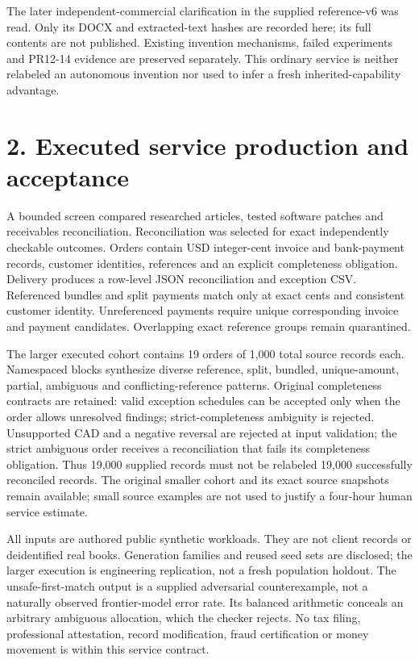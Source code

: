 \documentclass[10pt,letterpaper]{article}
\begin{document}
The later independent-commercial clarification in the supplied reference-v6 was read. Only its DOCX and extracted-text hashes are recorded here; its full contents are not published. Existing invention mechanisms, failed experiments and PR12-14 evidence are preserved separately. This ordinary service is neither relabeled an autonomous invention nor used to infer a fresh inherited-capability advantage.

\section*{2. Executed service production and acceptance}
A bounded screen compared researched articles, tested software patches and receivables reconciliation. Reconciliation was selected for exact independently checkable outcomes. Orders contain USD integer-cent invoice and bank-payment records, customer identities, references and an explicit completeness obligation. Delivery produces a row-level JSON reconciliation and exception CSV. Referenced bundles and split payments match only at exact cents and consistent customer identity. Unreferenced payments require unique corresponding invoice and payment candidates. Overlapping exact reference groups remain quarantined.

The larger executed cohort contains 19 orders of 1,000 total source records each. Namespaced blocks synthesize diverse reference, split, bundled, unique-amount, partial, ambiguous and conflicting-reference patterns. Original completeness contracts are retained: valid exception schedules can be accepted only when the order allows unresolved findings; strict-completeness ambiguity is rejected. Unsupported CAD and a negative reversal are rejected at input validation; the strict ambiguous order receives a reconciliation that fails its completeness obligation. Thus 19,000 supplied records must not be relabeled 19,000 successfully reconciled records. The original smaller cohort and its exact source snapshots remain available; small source examples are not used to justify a four-hour human service estimate.

All inputs are authored public synthetic workloads. They are not client records or deidentified real books. Generation families and reused seed sets are disclosed; the larger execution is engineering replication, not a fresh population holdout. The unsafe-first-match output is a supplied adversarial counterexample, not a naturally observed frontier-model error rate. Its balanced arithmetic conceals an arbitrary ambiguous allocation, which the checker rejects. No tax filing, professional attestation, record modification, fraud certification or money movement is within this service contract.
\end{document}
